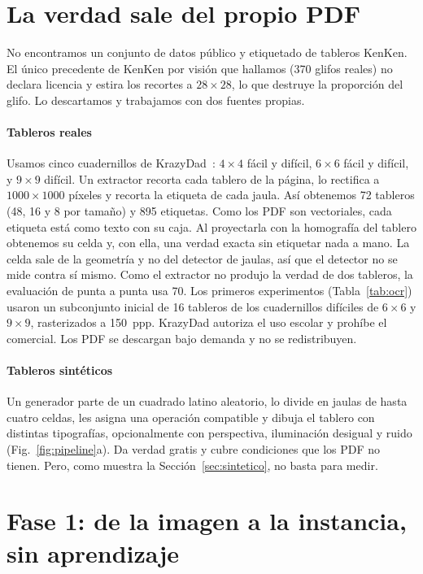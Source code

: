 \documentclass[conference]{IEEEtran}
\begin{document}
\section{La verdad sale del propio PDF}\label{sec:datos}
No encontramos un conjunto de datos público y etiquetado de tableros KenKen. El único precedente de KenKen por visión que hallamos (370 glifos reales) no declara licencia y estira los recortes a $28 \times 28$, lo que destruye la proporción del glifo. Lo descartamos y trabajamos con dos fuentes propias.

\paragraph{Tableros reales}
Usamos cinco cuadernillos de KrazyDad~\cite{krazydad}: $4 \times 4$ fácil y difícil, $6 \times 6$ fácil y difícil, y $9 \times 9$ difícil. Un extractor recorta cada tablero de la página, lo rectifica a $1000 \times 1000$ píxeles y recorta la etiqueta de cada jaula. Así obtenemos 72 tableros (48, 16 y 8 por tamaño) y 895 etiquetas. Como los PDF son vectoriales, cada etiqueta está como texto con su caja. Al proyectarla con la homografía del tablero obtenemos su celda y, con ella, una verdad exacta sin etiquetar nada a mano. La celda sale de la geometría y no del detector de jaulas, así que el detector no se mide contra sí mismo. Como el extractor no produjo la verdad de dos tableros, la evaluación de punta a punta usa 70. Los primeros experimentos (Tabla~\ref{tab:ocr}) usaron un subconjunto inicial de 16 tableros de los cuadernillos difíciles de $6 \times 6$ y $9 \times 9$, rasterizados a 150~ppp. KrazyDad autoriza el uso escolar y prohíbe el comercial. Los PDF se descargan bajo demanda y no se redistribuyen.

\paragraph{Tableros sintéticos}
Un generador parte de un cuadrado latino aleatorio, lo divide en jaulas de hasta cuatro celdas, les asigna una operación compatible y dibuja el tablero con distintas tipografías, opcionalmente con perspectiva, iluminación desigual y ruido (Fig.~\ref{fig:pipeline}a). Da verdad gratis y cubre condiciones que los PDF no tienen. Pero, como muestra la Sección~\ref{sec:sintetico}, no basta para medir.

\section{Fase 1: de la imagen a la instancia, sin aprendizaje}\label{sec:fase1}
\end{document}
